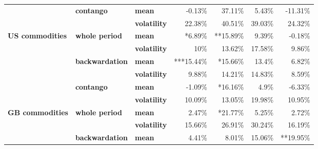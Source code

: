 \documentclass[
  authoryear,
  preprint,
  3p]{elsarticle}
\begin{document}
\begin{longtable}[t]{>{}l>{}l>{}l>{}r>{}r>{}r>{}r}
\textbf{} & \textbf{contango} & \textbf{mean} & \textcolor[HTML]{4285f4}{-0.13\%} & \textcolor[HTML]{4285f4}{37.11\%} & \textcolor[HTML]{4285f4}{5.43\%} & \textcolor[HTML]{4285f4}{-11.31\%}\\
\textbf{} & \textbf{} & \textbf{volatility} & \textcolor[HTML]{4285f4}{22.38\%} & \textcolor[HTML]{4285f4}{40.51\%} & \textcolor[HTML]{4285f4}{39.03\%} & \textcolor[HTML]{4285f4}{24.32\%}\\
\addlinespace
\textbf{US commodities} & \textbf{whole period} & \textbf{mean} & \textcolor[HTML]{4285f4}{*6.89\%} & \textcolor[HTML]{4285f4}{**15.89\%} & \textcolor[HTML]{4285f4}{9.39\%} & \textcolor[HTML]{4285f4}{-0.18\%}\\
\textbf{} & \textbf{} & \textbf{volatility} & \textcolor[HTML]{4285f4}{10\%} & \textcolor[HTML]{4285f4}{13.62\%} & \textcolor[HTML]{4285f4}{17.58\%} & \textcolor[HTML]{4285f4}{9.86\%}\\
\textbf{} & \textbf{backwardation} & \textbf{mean} & \textcolor[HTML]{4285f4}{***15.44\%} & \textcolor[HTML]{4285f4}{*15.66\%} & \textcolor[HTML]{4285f4}{13.4\%} & \textcolor[HTML]{4285f4}{6.82\%}\\
\textbf{} & \textbf{} & \textbf{volatility} & \textcolor[HTML]{4285f4}{9.88\%} & \textcolor[HTML]{4285f4}{14.21\%} & \textcolor[HTML]{4285f4}{14.83\%} & \textcolor[HTML]{4285f4}{8.59\%}\\
\textbf{} & \textbf{contango} & \textbf{mean} & \textcolor[HTML]{4285f4}{-1.09\%} & \textcolor[HTML]{4285f4}{*16.16\%} & \textcolor[HTML]{4285f4}{4.9\%} & \textcolor[HTML]{4285f4}{-6.33\%}\\
\addlinespace
\textbf{} & \textbf{} & \textbf{volatility} & \textcolor[HTML]{4285f4}{10.09\%} & \textcolor[HTML]{4285f4}{13.05\%} & \textcolor[HTML]{4285f4}{19.98\%} & \textcolor[HTML]{4285f4}{10.95\%}\\
\textbf{GB commodities} & \textbf{whole period} & \textbf{mean} & \textcolor[HTML]{4285f4}{2.47\%} & \textcolor[HTML]{4285f4}{*21.77\%} & \textcolor[HTML]{4285f4}{5.25\%} & \textcolor[HTML]{4285f4}{2.72\%}\\
\textbf{} & \textbf{} & \textbf{volatility} & \textcolor[HTML]{4285f4}{15.66\%} & \textcolor[HTML]{4285f4}{26.91\%} & \textcolor[HTML]{4285f4}{30.24\%} & \textcolor[HTML]{4285f4}{16.19\%}\\
\textbf{} & \textbf{backwardation} & \textbf{mean} & \textcolor[HTML]{4285f4}{4.41\%} & \textcolor[HTML]{4285f4}{8.01\%} & \textcolor[HTML]{4285f4}{15.06\%} & \textcolor[HTML]{4285f4}{**19.95\%}\\

\end{longtable}
\end{document}
